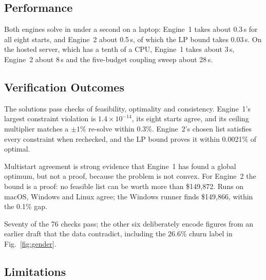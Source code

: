 \documentclass[conference]{IEEEtran}
\begin{document}
\subsection{Performance}

Both engines solve in under a second on a laptop: Engine~1 takes about 0.3\,s for all eight starts, and Engine~2 about 0.5\,s, of which the LP bound takes 0.03\,s. On the hosted server, which has a tenth of a CPU, Engine~1 takes about 3\,s, Engine~2 about 8\,s and the five-budget coupling sweep about 28\,s.

\subsection{Verification Outcomes}
\label{sec:res-verify}

The solutions pass checks of feasibility, optimality and consistency. Engine~1's largest constraint violation is $1.4\times10^{-14}$, its eight starts agree, and its ceiling multiplier matches a $\pm 1\%$ re-solve within 0.3\%. Engine~2's chosen list satisfies every constraint when rechecked, and the LP bound proves it within 0.0021\% of optimal.

Multistart agreement is strong evidence that Engine~1 has found a global optimum, but not a proof, because the problem is not convex. For Engine~2 the bound is a proof: no feasible list can be worth more than \$149,872. Runs on macOS, Windows and Linux agree; the Windows runner finds \$149,866, within the 0.1\% gap.

Seventy of the 76 checks pass; the other six deliberately encode figures from an earlier draft that the data contradict, including the 26.6\% churn label in Fig.~\ref{fig:gender}.


\subsection{Limitations}
\label{sec:res-limits}
\end{document}
